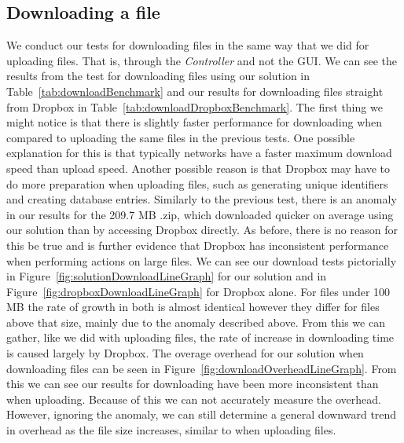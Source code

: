 \documentclass[12pt, titlepage]{article}
\begin{document}
\subsection{Downloading a file}
We conduct our tests for downloading files in the same way that we did for uploading files. That is, through the \textit{Controller} and not the GUI.
\newline \indent We can see the results from the test for downloading files using our solution in Table~\ref{tab:downloadBenchmark} and our results for downloading files straight from Dropbox in Table~\ref{tab:downloadDropboxBenchmark}. The first thing we might notice is that there is slightly faster performance for downloading when compared to uploading the same files in the previous tests. One possible explanation for this is that typically networks have a faster maximum download speed than upload speed. Another possible reason is that Dropbox may have to do more preparation when uploading files, such as generating unique identifiers and creating database entries.
\newline \indent Similarly to the previous test, there is an anomaly in our results for the 209.7 MB .zip, which downloaded quicker on average using our solution than by accessing Dropbox directly. As before, there is no reason for this be true and is further evidence that Dropbox has inconsistent performance when performing actions on large files.
\newline \indent We can see our download tests pictorially in Figure~\ref{fig:solutionDownloadLineGraph} for our solution and in Figure~\ref{fig:dropboxDownloadLineGraph} for Dropbox alone. For files under 100 MB the rate of growth in both is almost identical however they differ for files above that size, mainly due to the anomaly described above. From this we can gather, like we did with uploading files, the rate of increase in downloading time is caused largely by Dropbox.
\newline \indent The overage overhead for our solution when downloading files can be seen in Figure~\ref{fig:downloadOverheadLineGraph}. From this we can see our results for downloading have been more inconsistent than when uploading. Because of this we can not accurately measure the overhead. However, ignoring the anomaly, we can still determine a general downward trend in overhead as the file size increases, similar to when uploading files.
\end{document}
